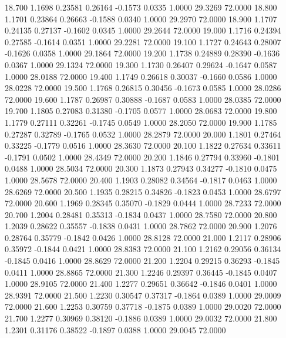   18.700   1.1698   0.23581   0.26164  -0.1573   0.0335   1.0000  29.3269  72.0000
  18.800   1.1701   0.23864   0.26663  -0.1588   0.0340   1.0000  29.2970  72.0000
  18.900   1.1707   0.24135   0.27137  -0.1602   0.0345   1.0000  29.2644  72.0000
  19.000   1.1716   0.24394   0.27585  -0.1614   0.0351   1.0000  29.2281  72.0000
  19.100   1.1727   0.24643   0.28007  -0.1626   0.0358   1.0000  29.1864  72.0000
  19.200   1.1738   0.24889   0.28390  -0.1636   0.0367   1.0000  29.1324  72.0000
  19.300   1.1730   0.26407   0.29624  -0.1647   0.0587   1.0000  28.0188  72.0000
  19.400   1.1749   0.26618   0.30037  -0.1660   0.0586   1.0000  28.0228  72.0000
  19.500   1.1768   0.26815   0.30456  -0.1673   0.0585   1.0000  28.0286  72.0000
  19.600   1.1787   0.26987   0.30888  -0.1687   0.0583   1.0000  28.0385  72.0000
  19.700   1.1805   0.27083   0.31380  -0.1705   0.0577   1.0000  28.0683  72.0000
  19.800   1.1779   0.27111   0.32261  -0.1745   0.0549   1.0000  28.2050  72.0000
  19.900   1.1785   0.27287   0.32789  -0.1765   0.0532   1.0000  28.2879  72.0000
  20.000   1.1801   0.27464   0.33225  -0.1779   0.0516   1.0000  28.3630  72.0000
  20.100   1.1822   0.27634   0.33611  -0.1791   0.0502   1.0000  28.4349  72.0000
  20.200   1.1846   0.27794   0.33960  -0.1801   0.0488   1.0000  28.5034  72.0000
  20.300   1.1873   0.27943   0.34277  -0.1810   0.0475   1.0000  28.5678  72.0000
  20.400   1.1903   0.28082   0.34564  -0.1817   0.0463   1.0000  28.6269  72.0000
  20.500   1.1935   0.28215   0.34826  -0.1823   0.0453   1.0000  28.6797  72.0000
  20.600   1.1969   0.28345   0.35070  -0.1829   0.0444   1.0000  28.7233  72.0000
  20.700   1.2004   0.28481   0.35313  -0.1834   0.0437   1.0000  28.7580  72.0000
  20.800   1.2039   0.28622   0.35557  -0.1838   0.0431   1.0000  28.7862  72.0000
  20.900   1.2076   0.28764   0.35779  -0.1842   0.0426   1.0000  28.8128  72.0000
  21.000   1.2117   0.28906   0.35972  -0.1844   0.0421   1.0000  28.8383  72.0000
  21.100   1.2162   0.29056   0.36134  -0.1845   0.0416   1.0000  28.8629  72.0000
  21.200   1.2204   0.29215   0.36293  -0.1845   0.0411   1.0000  28.8865  72.0000
  21.300   1.2246   0.29397   0.36445  -0.1845   0.0407   1.0000  28.9105  72.0000
  21.400   1.2277   0.29651   0.36642  -0.1846   0.0401   1.0000  28.9391  72.0000
  21.500   1.2230   0.30547   0.37317  -0.1864   0.0389   1.0000  29.0009  72.0000
  21.600   1.2253   0.30759   0.37718  -0.1875   0.0389   1.0000  29.0020  72.0000
  21.700   1.2277   0.30969   0.38120  -0.1886   0.0389   1.0000  29.0032  72.0000
  21.800   1.2301   0.31176   0.38522  -0.1897   0.0388   1.0000  29.0045  72.0000
